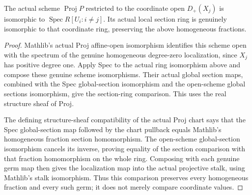 \begin{theorem}
\label{projective:native-scheme-coordinate-sections}
\leanok
{}
The actual scheme $\operatorname{Proj}P$ restricted to the coordinate
open $D_+(X_j)$ is isomorphic to $\operatorname{Spec}R[U_i:i\ne j]$.
Its actual local section ring is genuinely isomorphic to that coordinate
ring, preserving the above homogeneous fractions.
\end{theorem}
\begin{proof}
Mathlib's actual Proj affine-open isomorphism identifies this scheme open
with the spectrum of the genuine homogeneous degree-zero localization,
since $X_j$ has positive degree one. Apply Spec to the actual ring
isomorphism above and compose these genuine scheme isomorphisms.
Their actual global section maps, combined with the Spec global-section
isomorphism and the open-scheme global sections isomorphism, give the
section-ring comparison. This uses the real structure sheaf of Proj.

The defining structure-sheaf compatibility of the actual Proj chart says
that the Spec global-section map followed by the chart pullback equals
Mathlib's homogeneous fraction section homomorphism. The open-scheme
global-section isomorphism cancels its inverse, proving equality of the
section comparison with that fraction homomorphism on the whole ring.
Composing with each genuine germ map then gives the localization map into
the actual projective stalk, using Mathlib's stalk isomorphism. Thus this
comparison preserves every homogeneous fraction and every such germ; it
does not merely compare coordinate values.
\end{proof}
